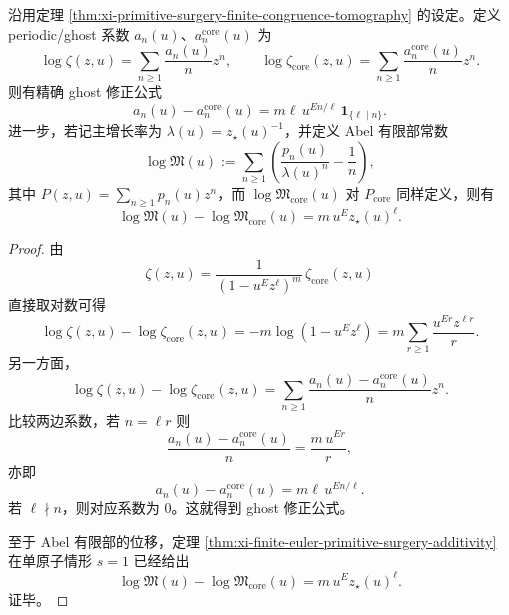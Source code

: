 \begin{theorem}\label{thm:xi-atomic-surgery-ghost-abel-shift-general}
沿用定理 \ref{thm:xi-primitive-surgery-finite-congruence-tomography} 的设定。定义 periodic/ghost 系数 \(a_n(u)\)、\(a_n^{\mathrm{core}}(u)\) 为
\[
\log \zeta(z,u)=\sum_{n\ge 1}\frac{a_n(u)}{n}z^n,
\qquad
\log \zeta_{\mathrm{core}}(z,u)=\sum_{n\ge 1}\frac{a_n^{\mathrm{core}}(u)}{n}z^n.
\]
则有精确 ghost 修正公式
\[
\boxed{\;
a_n(u)-a_n^{\mathrm{core}}(u)
=
m\ell\,u^{En/\ell}\,\mathbf 1_{\{\ell\mid n\}}.\;}
\]
进一步，若记主增长率为 \(\lambda(u)=z_\star(u)^{-1}\)，并定义 Abel 有限部常数
\[
\log\mathfrak M(u):=\sum_{n\ge 1}\left(\frac{p_n(u)}{\lambda(u)^n}-\frac1n\right),
\]
其中 \(P(z,u)=\sum_{n\ge 1}p_n(u)z^n\)，而 \(\log\mathfrak M_{\mathrm{core}}(u)\) 对 \(P_{\mathrm{core}}\) 同样定义，则有
\[
\boxed{\;
\log\mathfrak M(u)-\log\mathfrak M_{\mathrm{core}}(u)
=
m\,u^Ez_\star(u)^\ell.\;}
\]
\end{theorem}
\begin{proof}
由
\[
\zeta(z,u)=\frac{1}{(1-u^Ez^\ell)^m}\,\zeta_{\mathrm{core}}(z,u)
\]
直接取对数可得
\[
\log\zeta(z,u)-\log\zeta_{\mathrm{core}}(z,u)
=
-m\log(1-u^Ez^\ell)
=
m\sum_{r\ge 1}\frac{u^{Er}z^{\ell r}}{r}.
\]
另一方面，
\[
\log\zeta(z,u)-\log\zeta_{\mathrm{core}}(z,u)
=
\sum_{n\ge 1}\frac{a_n(u)-a_n^{\mathrm{core}}(u)}{n}z^n.
\]
比较两边系数，若 \(n=\ell r\) 则
\[
\frac{a_n(u)-a_n^{\mathrm{core}}(u)}{n}
=
\frac{m\,u^{Er}}{r},
\]
亦即
\[
a_n(u)-a_n^{\mathrm{core}}(u)
=
m\ell\,u^{En/\ell}.
\]
若 \(\ell\nmid n\)，则对应系数为 \(0\)。这就得到 ghost 修正公式。

至于 Abel 有限部的位移，定理 \ref{thm:xi-finite-euler-primitive-surgery-additivity} 在单原子情形 \(s=1\) 已经给出
\[
\log\mathfrak M(u)-\log\mathfrak M_{\mathrm{core}}(u)
=
m\,u^Ez_\star(u)^\ell.
\]
证毕。
\end{proof}








\endinput
